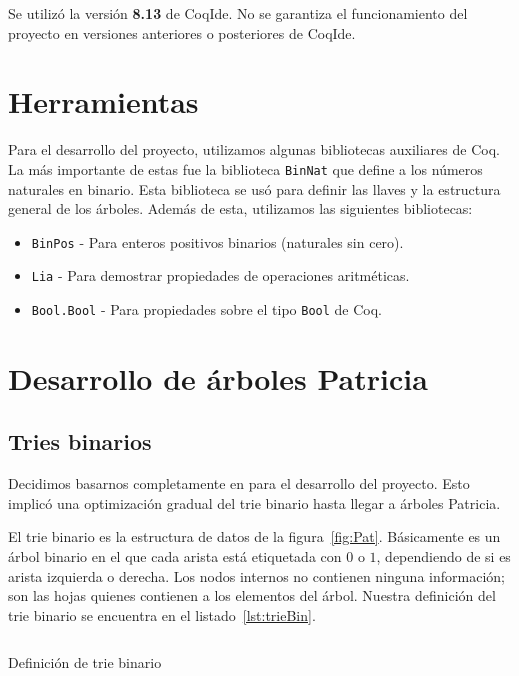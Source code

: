 \documentclass[11pt,letterpaper]{article}
\begin{document}
Se utilizó la versión \textbf{8.13} de CoqIde. No se garantiza el funcionamiento del proyecto en versiones anteriores o posteriores de CoqIde.

\section{Herramientas}

\noindent Para el desarrollo del proyecto, utilizamos algunas bibliotecas auxiliares de Coq. La más importante de estas fue la biblioteca \texttt{BinNat}\cite{} que define a los números naturales en binario. Esta biblioteca se usó para definir las llaves y la estructura general de los árboles. Además de esta, utilizamos las siguientes bibliotecas:
\begin{itemize}
\item \texttt{BinPos} - Para enteros positivos binarios (naturales sin cero).
\item \texttt{Lia} - Para demostrar propiedades de operaciones aritméticas.
\item \texttt{Bool.Bool} - Para propiedades sobre el tipo \texttt{Bool} de Coq.
\end{itemize}

\section{Desarrollo de árboles Patricia}\label{section:desarrollo}

\subsection{Tries binarios}

\noindent Decidimos basarnos completamente en\cite{} para el desarrollo del proyecto. Esto implicó una optimización gradual del trie binario hasta llegar a árboles Patricia.

El trie binario es la estructura de datos de la figura~\ref{fig:Pat}. Básicamente es un árbol binario en el que cada arista está etiquetada con $0$ o $1$, dependiendo de si es arista izquierda o derecha. Los nodos internos no contienen ninguna información; son las hojas quienes contienen a los elementos del árbol. Nuestra definición del trie binario se encuentra en el listado~\ref{lst:trieBin}.

\begin{listing}[H]
  \inputminted{coq}{src/trie.v}
  \caption{Definición de trie binario}
  \label{lst:trieBin}
\end{listing}
\end{document}
